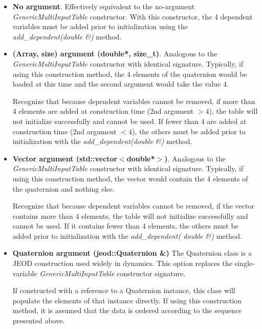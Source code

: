 \documentclass[11pt,fleqn]{report}
\begin{document}
\begin{itemize}
 \item \textbf{No argument}.  Effectively equivalent to the no-argument
       \textit{GenericMultiInputTable} constructor.  With this constructor,
       the 4 dependent variables must be added prior to initialization using
       the \textit{add\_dependent(double \&)} method.

 \item \textbf{(Array, size) argument (double*, size\_t)}.  Analogous to the
       \textit{GenericMultiInputTable} constructor with identical signature.
       Typically, if using this construction method, the 4 elements of the
       quaternion would be loaded at this time and the second argument would
       take the value 4.

       Recognize that because dependent variables cannot be removed, if
       more than 4 elements are added at construction time (2nd argument $>
       4$),
       the table will not initialize successfully and cannot be used.
       If fewer than 4 are added at
       construction time (2nd argument $< 4$), the others must be added prior
       to initialization with the \textit{add\_dependent(double \&)} method.

 \item \textbf{Vector argument (std::vector$<$double*$>$)}.  Analogous to the
       \textit{GenericMultiInputTable} constructor with identical signature.
       Typically, if using this construction method, the vector would contain
       the 4 elements of the quaternion and nothing else.

       Recognize that because dependent variables cannot be removed, if
       the vector contains more than 4 elements,
       the table will not initialize successfully and cannot be used.
       If it contains fewer than 4 elements, the others must be added prior
       to initialization with the \textit{add\_dependent( double \&)} method.

 \item \textbf{Quaternion argument (jeod::Quaternion \&)}  The Quaternion class is a
       JEOD construction used widely in dynamics.  This option replaces the
       single-variable \textit{GenericMultiInputTable} constructor signature.

       If constructed with a reference to a Quaternion instance, this
       class will populate the elements of that instance directly.
       If using this construction method, it is assumed that the data is
       ordered according to the sequence presented above.
\end{itemize}
\end{document}
